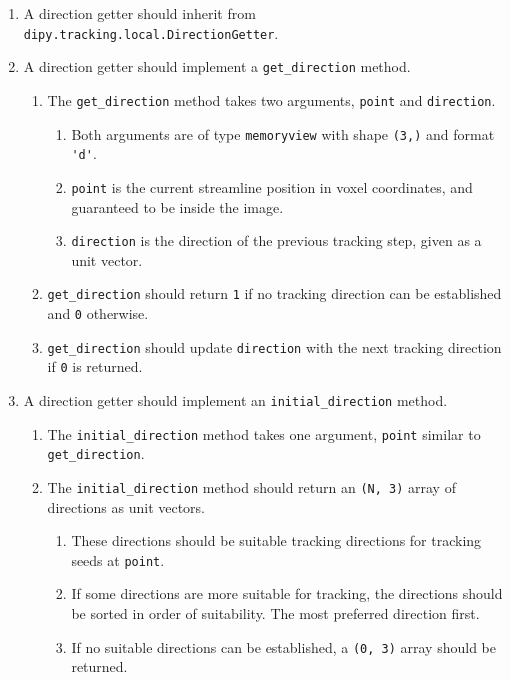     
\begin{enumerate}
\item A direction getter should inherit from \verb|dipy.tracking.local.DirectionGetter|.
\item A direction getter should implement a \verb|get_direction| method.
\begin{enumerate}
\item The \verb|get_direction| method takes two arguments, \verb|point| and \verb|direction|.
\begin{enumerate}
\item Both arguments are of type \verb|memoryview| with shape \verb|(3,)| and format \verb|'d'|.
\item \verb|point| is the current streamline position in voxel coordinates, and guaranteed to be inside the image.
\item \verb|direction| is the direction of the previous tracking step, given as a unit vector.
\end{enumerate}
\item \verb|get_direction| should return \verb|1| if no tracking direction can be established and \verb|0| otherwise.
\item \verb|get_direction| should update \verb|direction| with the next tracking direction if \verb|0| is returned.
\end{enumerate}
\item A direction getter should implement an \verb|initial_direction| method.
\begin{enumerate}
\item The \verb|initial_direction| method takes one argument, \verb|point| similar to \verb|get_direction|.
\item The \verb|initial_direction| method should return an \verb|(N, 3)| array of directions as unit vectors.
\begin{enumerate}
\item These directions should be suitable tracking directions for tracking seeds at \verb|point|.
\item If some directions are more suitable for tracking, the directions should be sorted in order of suitability. The most preferred direction first.  
\item If no suitable directions can be established, a \verb|(0, 3)| array should be returned.
\end{enumerate}
\end{enumerate}
\end{enumerate}
